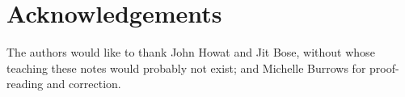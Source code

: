 \chapter{Acknowledgements}

The authors would like to thank John Howat and Jit Bose, without whose
teaching these notes would probably not exist; and Michelle Burrows
for proof-reading and correction.

